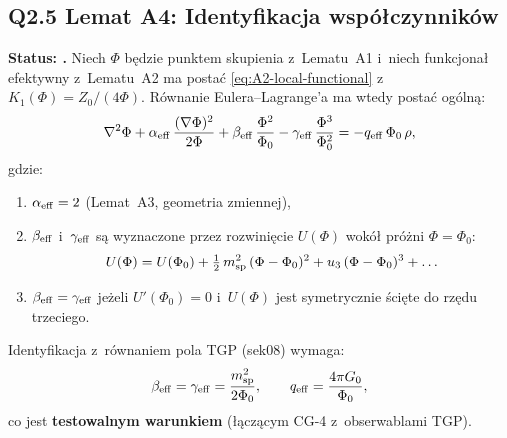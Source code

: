 \subsection*{Q2.5 Lemat A4: Identyfikacja wsp\'o\l{}czynnik\'ow}
\label{ssec:lemma-A4}

\begin{lemma}%
\label{lem:A4-coefficients}
\textbf{Status: .}
Niech $\Phi$ b\k{e}dzie punktem skupienia z~Lematu~A1
i~niech funkcjona\l{} efektywny z~Lematu~A2 ma posta\'c
\eqref{eq:A2-local-functional} z~$K_1(\Phi) = Z_0/(4\Phi)$.
R\'ownanie Eulera--Lagrange'a ma wtedy posta\'c og\'oln\k{a}:
\begin{equation}
  \nabla^2\Phi + \alpha_{\rm eff}\,\frac{(\nabla\Phi)^2}{2\Phi}
  + \beta_{\rm eff}\,\frac{\Phi^2}{\Phi_0}
  - \gamma_{\rm eff}\,\frac{\Phi^3}{\Phi_0^2}
  = -q_{\rm eff}\,\Phi_0\,\rho,
  \label{eq:A4-general-PDE}
\end{equation}
gdzie:
\begin{enumerate}[nosep]
  \item $\alpha_{\rm eff} = 2$ (Lemat~A3, geometria zmiennej),
  \item $\beta_{\rm eff}$ i~$\gamma_{\rm eff}$ s\k{a} wyznaczone przez
    rozwinięcie $U(\Phi)$ wok\'o\l{} pr\'o\.zni $\Phi = \Phi_0$:
    \begin{equation}
      U(\Phi) = U(\Phi_0)
        + \tfrac{1}{2}\,m_{\rm sp}^2\,(\Phi - \Phi_0)^2
        + u_3\,(\Phi - \Phi_0)^3
        + \ldots
      \label{eq:A4-potential-expansion}
    \end{equation}
  \item $\beta_{\rm eff} = \gamma_{\rm eff}$
    je\.zeli $U'(\Phi_0) = 0$ i~$U(\Phi)$ jest symetrycznie \'sci\k{e}te
    do rz\k{e}du trzeciego.
\end{enumerate}
Identyfikacja z~r\'ownaniem pola TGP (sek08) wymaga:
\begin{equation}
  \beta_{\rm eff} = \gamma_{\rm eff}
  = \frac{m_{\rm sp}^2}{2\Phi_0},
  \qquad
  q_{\rm eff} = \frac{4\pi G_0}{\Phi_0},
  \label{eq:A4-identification}
\end{equation}
co jest \textbf{testowalnym warunkiem} (\l{}\k{a}cz\k{a}cym CG-4 z~obserwablami TGP).
\end{lemma}

